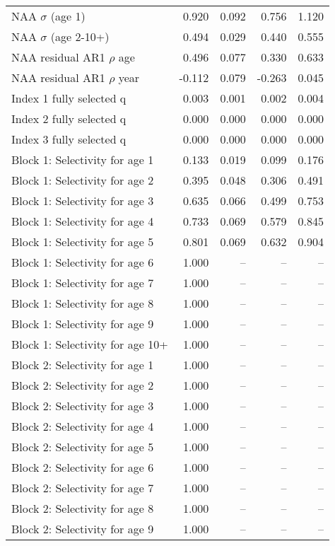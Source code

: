 \documentclass[
]{article}
\begin{document}
\begin{landscape}
\begin{longtable}[t]{lrrrr}
\endfoot
\bottomrule
\endlastfoot
NAA $\sigma$ (age 1) & 0.920 & 0.092 & 0.756 & 1.120\\
NAA $\sigma$ (age 2-10+) & 0.494 & 0.029 & 0.440 & 0.555\\
NAA residual AR1 $\rho$ age & 0.496 & 0.077 & 0.330 & 0.633\\
NAA residual AR1 $\rho$ year & -0.112 & 0.079 & -0.263 & 0.045\\
Index 1 fully selected q & 0.003 & 0.001 & 0.002 & 0.004\\
\addlinespace
Index 2 fully selected q & 0.000 & 0.000 & 0.000 & 0.000\\
Index 3 fully selected q & 0.000 & 0.000 & 0.000 & 0.000\\
Block 1: Selectivity for age 1 & 0.133 & 0.019 & 0.099 & 0.176\\
Block 1: Selectivity for age 2 & 0.395 & 0.048 & 0.306 & 0.491\\
Block 1: Selectivity for age 3 & 0.635 & 0.066 & 0.499 & 0.753\\
\addlinespace
Block 1: Selectivity for age 4 & 0.733 & 0.069 & 0.579 & 0.845\\
Block 1: Selectivity for age 5 & 0.801 & 0.069 & 0.632 & 0.904\\
Block 1: Selectivity for age 6 & 1.000 & -- & -- & --\\
Block 1: Selectivity for age 7 & 1.000 & -- & -- & --\\
Block 1: Selectivity for age 8 & 1.000 & -- & -- & --\\
\addlinespace
Block 1: Selectivity for age 9 & 1.000 & -- & -- & --\\
Block 1: Selectivity for age 10+ & 1.000 & -- & -- & --\\
Block 2: Selectivity for age 1 & 1.000 & -- & -- & --\\
Block 2: Selectivity for age 2 & 1.000 & -- & -- & --\\
Block 2: Selectivity for age 3 & 1.000 & -- & -- & --\\
\addlinespace
Block 2: Selectivity for age 4 & 1.000 & -- & -- & --\\
Block 2: Selectivity for age 5 & 1.000 & -- & -- & --\\
Block 2: Selectivity for age 6 & 1.000 & -- & -- & --\\
Block 2: Selectivity for age 7 & 1.000 & -- & -- & --\\
Block 2: Selectivity for age 8 & 1.000 & -- & -- & --\\
\addlinespace
Block 2: Selectivity for age 9 & 1.000 & -- & -- & --\\

\end{longtable}
\end{landscape}
\end{document}
